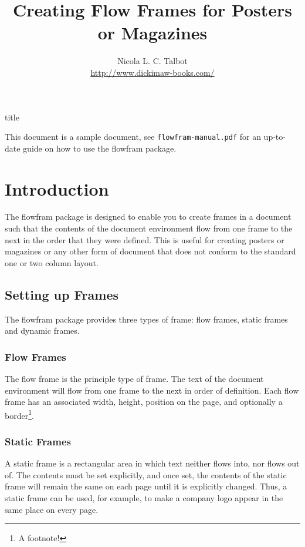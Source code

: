 \documentclass[a4paper]{article}
\newcommand{\sty}[1]{\textsf{#1}}
\newcommand{\env}[1]{\textsf{#1}}
\begin{document}
\begin{staticcontents*}{title}
\title{Creating Flow Frames for Posters or Magazines}
\author{Nicola L. C. Talbot\\[1cm]\url{http://www.dickimaw-books.com/}}
\date{}
\maketitle
\end{staticcontents*}

This document is a sample document, see \linebreak
\texttt{flowfram-manual.pdf} for 
an up-to-date guide on how to use the \sty{flowfram} package.

\section{Introduction}

The \sty{flowfram} package is designed to enable you to create
frames in a document such that the 
contents of the \env{document} environment flow from one 
frame to the next in the order that they were defined.  
This is useful for creating posters
or magazines or any other form of document that does not 
conform to the standard one or two column layout.

\subsection{Setting up Frames}

The \sty{flowfram} package provides three types of frame:
{flow frames}, {static 
frames} and {dynamic frames}.

\subsubsection{Flow Frames}

The flow frame is the principle type of frame.
The text of the \env{document} environment will flow from 
one frame to the next in order of definition. Each 
flow frame has an associated width, height, 
position on the page, and optionally a border\footnote{A
footnote!}.

\subsubsection{Static Frames}

A static frame is a rectangular area in which text neither
flows into, nor flows out of.  The contents must be set
explicitly, and once set, the contents of the static frame will
remain the same on each page until it is explicitly 
changed.  Thus, a static frame can be used, for example, to make 
a company logo appear in the same place on every page.
\end{document}
